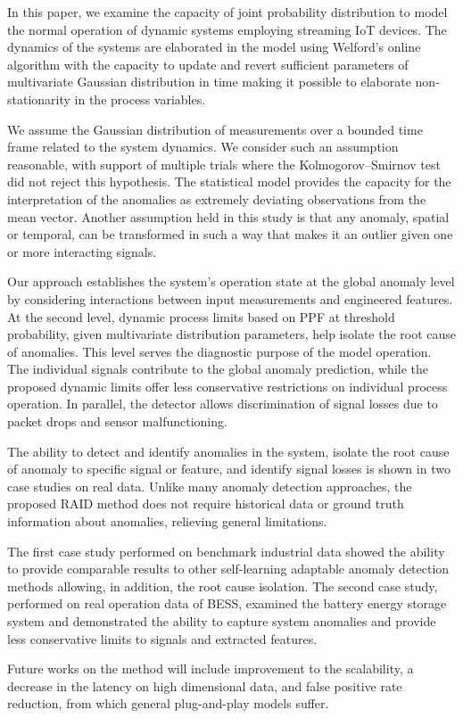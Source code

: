 In this paper, we examine the capacity of joint probability distribution to model the normal operation of dynamic systems employing streaming IoT devices. The dynamics of the systems are elaborated in the model using Welford’s online algorithm with the capacity to update and revert sufficient parameters of multivariate Gaussian distribution in time making it possible to elaborate non-stationarity in the process variables.

We assume the Gaussian distribution of measurements over a bounded time frame related to the system dynamics. We consider such an assumption reasonable, with support of multiple trials where the Kolmogorov–Smirnov test did not reject this hypothesis. The statistical model provides the capacity for the interpretation of the anomalies as extremely deviating observations from the mean vector. Another assumption held in this study is that any anomaly, spatial or temporal, can be transformed in such a way that makes it an outlier given one or more interacting signals.

Our approach establishes the system's operation state at the global anomaly level by considering interactions between input measurements and engineered features. At the second level, dynamic process limits based on PPF at threshold probability, given multivariate distribution parameters, help isolate the root cause of anomalies. This level serves the diagnostic purpose of the model operation. The individual signals contribute to the global anomaly prediction, while the proposed dynamic limits offer less conservative restrictions on individual process operation. In parallel, the detector allows discrimination of signal losses due to packet drops and sensor malfunctioning.

The ability to detect and identify anomalies in the system, isolate the root cause of anomaly to specific signal or feature, and identify signal losses is shown in two case studies on real data. Unlike many anomaly detection approaches, the proposed RAID method does not require historical data or ground truth information about anomalies, relieving general limitations.

The first case study performed on benchmark industrial data showed the ability to provide comparable results to other self-learning adaptable anomaly detection methods allowing, in addition, the root cause isolation.
The second case study, performed on real operation data of BESS, examined the battery energy storage system and demonstrated the ability to capture system anomalies and provide less conservative limits to signals and extracted features.

Future works on the method will include improvement to the scalability, a decrease in the latency on high dimensional data, and false positive rate reduction, from which general plug-and-play models suffer.
